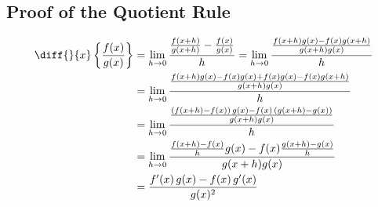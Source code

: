 \subsection*{Proof of the Quotient Rule}
\begin{align*}
  \diff{}{x} \left\{ \frac{f(x)}{g(x)} \right\} &= \lim_{h\to 0}\frac{\frac{f(x+h)}{g(x+h)} - \frac{f(x)}{g(x)}}{h} =\lim_{h\to 0}\frac{\frac{f(x+h)g(x) - f(x)g(x+h)}{g(x+h)g(x)}}{h} \\
  &=\lim_{h\to 0}\frac{\frac{f(x+h)g(x) - f(x)g(x) + f(x)g(x) - f(x)g(x+h)}{g(x+h)g(x)}}{h} \\
  &=\lim_{h\to 0}\frac{\frac{(f(x+h) - f(x))\,g(x) - f(x)\,(g(x + h) - g(x))}{g(x+h)g(x)}}{h} \\
  &=\lim_{h\to 0}\frac{\frac{f(x+h) - f(x)}{h}g(x) - f(x)\frac{g(x + h) - g(x)}{h}}{g(x+h)g(x)} \\
  &= \frac{f'(x) \, g(x) - f(x) \, g'(x)}{g(x)^2}
\end{align*}
